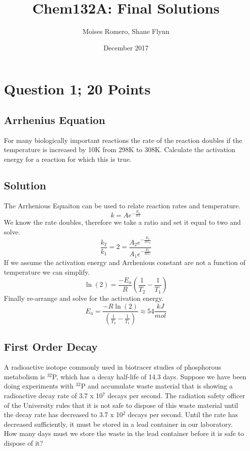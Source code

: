 \documentclass{article}
\title{Chem132A: Final Solutions}
\author{Moises Romero, Shane Flynn}
\date{December 2017}
\newcommand{\be}{\begin{equation}}
\newcommand{\ee}{\end{equation}}
\begin{document}
\maketitle

\section*{Question 1; 20 Points}

\subsection*{Arrhenius Equation}
For many biologically important reactions the rate of the reaction doubles if the temperature is increased by 10K from 298K to 308K. Calculate the activation energy for a reaction for which this is true.

\subsection*{Solution}
The Arrhenious Equaiton can be used to relate reaction rates and temperature. 
\be
k = Ae^{-\frac{E_a}{RT}}
\ee
We know the rate doubles, therefore we take a ratio and set it equal to two and solve. 
\be
\frac{k_2}{k_1} = 2 = \frac{A_2e^{-\frac{E_2}{RT_2}}}{A_1e^{-\frac{E_1}{RT_1}}}
\ee
If we assume the activation energy and Arrhenious constant are not a function of temperature we can simplify. 
\be
\ln(2) = \frac{-E_a}{R}\left(\frac{1}{T_2}-\frac{1}{T_1}\right)
\ee
Finally re-arrange and solve for the activation energy. 
\be
E_a = \frac{-R\ln(2)}{\left(\frac{1}{T_2}-\frac{1}{T_1}\right)} \approx 54\frac{kJ}{mol}
\ee

\subsection*{First Order Decay}
A radioactive isotope commonly used in biotracer studies of phosphorous metabolism is $^{32}$P, which has a decay half-life of 14.3 days.
Suppose we have been doing experiments with $^{32}$P and accumulate waste material that is showing a radioactive decay rate of 3.7 x 10$^7$ decays per second.
The radiation safety officer of the University rules that it is not safe to dispose of this waste material until the decay rate has decreased to 3.7 x 10$^2$ decays per second. 
Until the rate has decreased sufficiently, it must be stored in a lead container in our laboratory. 
How many days must we store the waste in the lead container before it is safe to dispose of it?
\end{document}
